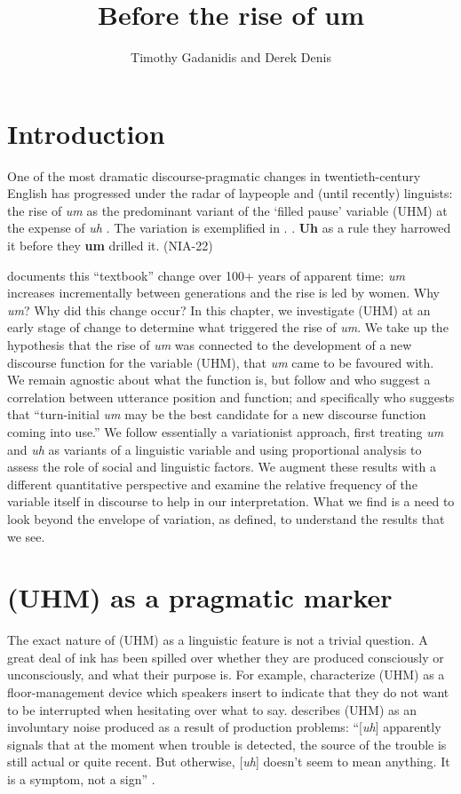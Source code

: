 \documentclass[11pt]{article}
\title{Before the rise of um}
\author{Timothy Gadanidis and Derek Denis}
\begin{document}
\maketitle

\section{Introduction}

One of the most dramatic discourse-pragmatic changes in twentieth-century
English has progressed under the radar of laypeople and (until recently)
linguists: the rise of \emph{um} as the predominant variant of the `filled
pause' variable (UHM) at the expense of \emph{uh} \parencite{tottie2011,
fruehwald2016, wielingetal2016}.
The variation is exemplified in \Next.
\ex. \textbf{Uh} as a rule they harrowed it before they \textbf{um} drilled it.
\hfill (NIA-22)

\textcite[43]{fruehwald2016} documents this ``textbook'' change over 100+ years
of apparent time:
\emph{um} increases incrementally between generations and the rise is led by
women.
Why \emph{um}? Why did this change occur?
In this chapter, we investigate (UHM) at an early stage of change to determine
what triggered the rise of \emph{um}.
We take up the hypothesis that the rise of \emph{um} was connected to the
development of a new discourse function for the variable (UHM), that \emph{um}
came to be favoured with.
We remain agnostic about what the function is, but follow \textcite{tottie2016}
and \textcite{fruehwald2016} who suggest a correlation between utterance
position and function; and specifically \textcite[46]{fruehwald2016} who suggests
that ``turn-initial \emph{um} may be the best candidate for a new
discourse function coming into use.''
We follow essentially a variationist approach, first treating \emph{um} and
\emph{uh} as variants of a linguistic variable and using proportional analysis
to assess the role of social and linguistic factors.
We augment these results with a different quantitative perspective and examine
the relative frequency of the variable itself in discourse to help in our
interpretation.
What we find is a need to look beyond the envelope of variation, as defined, to
understand the results that we see.

\section{(UHM) as a pragmatic marker}

The exact nature of (UHM) as a linguistic feature is not a trivial question.
A great deal of ink has been spilled over whether they are produced consciously
or unconsciously, and what their purpose is.
For example, \textcite[41--42]{maclayosgood1959} characterize (UHM) as a
floor-management device which speakers insert to indicate that they do not want
to be interrupted when hesitating over what to say.
\textcite{levelt1983, levelt1989} describes (UHM) as an involuntary noise
produced as a result of production problems: ``[\emph{uh}] apparently signals that
at the moment when trouble is detected, the source of the trouble is still
actual or quite recent. But otherwise, [\emph{uh}] doesn't seem to mean anything.
It is a symptom, not a sign'' \parencite[484]{levelt1989}.
\end{document}
